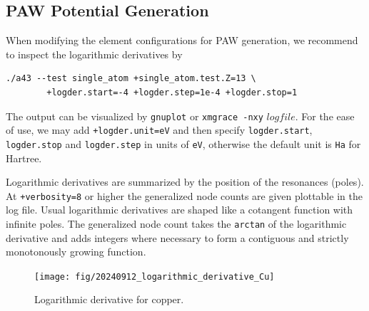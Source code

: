 \documentclass[oribibl]{llncs}
\newcommand{\ttt}[1]{\texttt{#1}}
\begin{document}
\subsection{PAW Potential Generation} \label{sec:single-atom}
%
When modifying the element configurations for \ac{PAW} generation,
we recommend to inspect the logarithmic derivatives by
\begin{verbatim}
./a43 --test single_atom +single_atom.test.Z=13 \
        +logder.start=-4 +logder.step=1e-4 +logder.stop=1
\end{verbatim}
The output can be visualized by \ttt{gnuplot} or \ttt{xmgrace -nxy} $logfile$.
%
\noindent
For the ease of use, we may add \ttt{+logder.unit=eV} and then specify
\ttt{logder.start}, \ttt{logder.stop} and \ttt{logder.step} in units of \ttt{eV}, otherwise the default unit is \ttt{Ha} for Hartree.

\noindent
Logarithmic derivatives are summarized by the position of the resonances (poles).
At \ttt{+verbosity=8} or higher the generalized node counts are given plottable in the log file.
Usual logarithmic derivatives are shaped like a cotangent function with infinite poles.
The generalized node count takes the \ttt{arctan} of the logarithmic derivative and adds integers where necessary to form a contiguous and strictly monotonously growing function.

\begin{figure}[h]
	\centering
	\texttt{[image: fig/20240912\_logarithmic\_derivative\_Cu]}
	\label{fig:logarithmic-derivative-Cu}
	\caption{Logarithmic derivative for copper. 
	         }
\end{figure}
\end{document}
